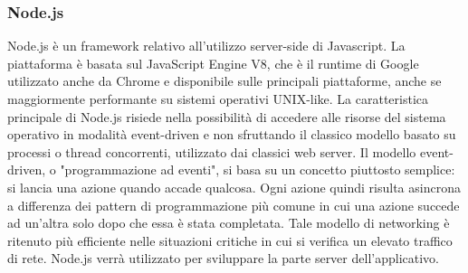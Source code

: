 \subsubsection{Node.js}
Node.js è un framework relativo all'utilizzo server-side di Javascript.
La piattaforma è basata sul JavaScript Engine V8, che è il runtime di Google utilizzato anche da Chrome e disponibile sulle principali piattaforme, anche se maggiormente performante su sistemi operativi UNIX-like.
La caratteristica principale di Node.js risiede nella possibilità di accedere alle risorse del sistema operativo in modalità event-driven e non sfruttando il classico modello basato su processi o thread concorrenti, utilizzato dai classici web server.
Il modello event-driven, o "programmazione ad eventi", si basa su un concetto piuttosto semplice: si lancia una azione quando accade qualcosa. Ogni azione quindi risulta asincrona a differenza dei pattern di programmazione più comune in cui una azione succede ad un'altra solo dopo che essa è stata completata.
Tale modello di networking è ritenuto più efficiente nelle situazioni critiche in cui si verifica un elevato traffico di rete.
Node.js verrà utilizzato per sviluppare la parte server dell'applicativo.



